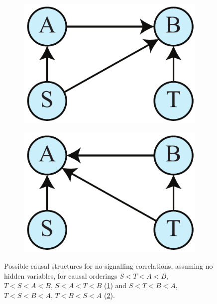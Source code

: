 \documentclass[12pt,onecolumn,nofootinbib]{revtex4-2}
\begin{document}
\begin{figure}[h]
        \begin{subfigure}[b]{0.18\textwidth}
                	\centering
                	\includegraphics[width=\textwidth]{bell-gen-AB}
		\subcaption{}
		\label{fig:bell-gen-AB}
	\end{subfigure}
        \hspace{8em}
        \begin{subfigure}[b]{0.18\textwidth}
                	\centering
                	\includegraphics[width=\textwidth]{bell-gen-BA}
             	\subcaption{}
                	\label{fig:bell-gen-BA}
        \end{subfigure}
        \caption{Possible causal structures for no-signalling correlations, assuming no hidden variables, for causal orderings $S<T<A<B$, $T<S<A<B$, $S<A<T<B$ (\ref{fig:bell-gen-AB}) and $S<T<B<A$, $T<S<B<A$, $T<B<S<A$ (\ref{fig:bell-gen-BA}).}
        \label{fig:bell-gen-ind}
\end{figure}
\end{document}
